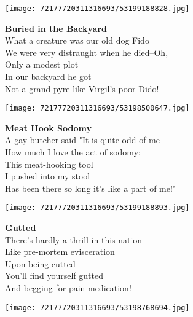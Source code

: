 \documentclass[10pt,letterpaper]{article}
\begin{document}
\begin{center}
\texttt{[image: 72177720311316693/53199188828.jpg]}
\end{center}

\begin{center}
\textbf{Buried in the Backyard}\\
\vskip 0.2in
What a creature was our old dog Fido\\
We were very distraught when he died--Oh,\\
Only a modest plot\\
In our backyard he got\\
Not a grand pyre like Virgil's poor Dido!\\
\end{center}
\pagebreak

\begin{center}
\texttt{[image: 72177720311316693/53198500647.jpg]}
\end{center}

\begin{center}
\textbf{Meat Hook Sodomy}\\
\vskip 0.2in
A gay butcher said "It is quite odd of me\\
How much I love the act of sodomy;\\
This meat-hooking tool\\
I pushed into my stool\\
Has been there so long it's like a part of me!"\\
\end{center}
\pagebreak

\begin{center}
\texttt{[image: 72177720311316693/53199188893.jpg]}
\end{center}

\begin{center}
\textbf{Gutted}\\
\vskip 0.2in
There's hardly a thrill in this nation\\
Like pre-mortem evisceration\\
Upon being cutted\\
You'll find yourself gutted\\
And begging for pain medication!\\
\end{center}
\pagebreak

\begin{center}
\texttt{[image: 72177720311316693/53198768694.jpg]}
\end{center}
\end{document}

